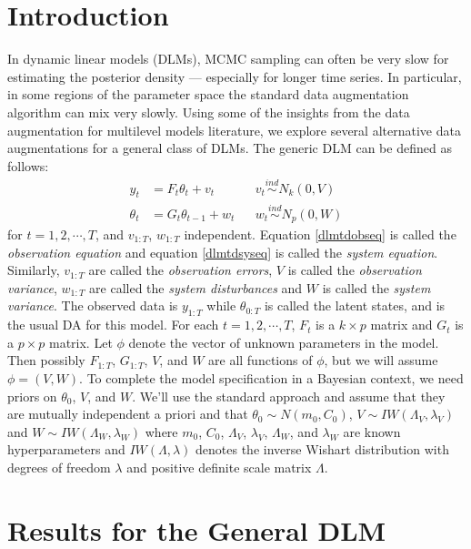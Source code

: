 \documentclass{article}\usepackage[]{graphicx}\usepackage[]{color}
\begin{document}
\section{Introduction}
In dynamic linear models (DLMs), MCMC sampling can often be very slow for estimating the posterior density --- especially for longer time series. In particular, in some regions of the parameter space the standard data augmentation algorithm can mix very slowly. Using some of the insights from the data augmentation for multilevel models literature, we explore several alternative data augmentations for a general class of DLMs. The generic DLM can be defined as follows:
\begin{align}
  y_t &= F_t\theta_t + v_t && v_t \stackrel{ind}{\sim} N_k(0,V) \label{dlmtdobseq}\\
  \theta_t &= G_t\theta_{t-1} + w_t && w_t \stackrel{ind}{\sim} N_p(0,W) \label{dlmtdsyseq}
\end{align}
for $t=1,2,\cdots,T$, and $v_{1:T}$, $w_{1:T}$ independent. Equation \eqref{dlmtdobseq} is called the {\it observation equation} and equation \eqref{dlmtdsyseq} is called the {\it system equation}. Similarly, $v_{1:T}$ are called the {\it observation errors}, $V$ is called the {\it observation variance}, $w_{1:T}$ are called the {\it system disturbances} and $W$ is called the {\it system variance}. The observed data is $y_{1:T}$ while $\theta_{0:T}$ is called the latent states, and is the usual DA for this model. For each $t=1,2,\cdots,T$, $F_t$ is a $k\times p$ matrix and $G_t$ is a $p\times p$ matrix. Let $\phi$ denote the vector of unknown parameters in the model. Then possibly $F_{1:T}$, $G_{1:T}$, $V$, and $W$ are all functions of $\phi$, but we will assume $\phi=(V,W)$. To complete the model specification in a Bayesian context, we need priors on $\theta_0$, $V$, and $W$. We'll use the standard approach and assume that they are mutually independent a priori and that $\theta_0 \sim N(m_0, C_0)$, $V \sim IW(\Lambda_V, \lambda_V)$ and $W \sim IW(\Lambda_W, \lambda_W)$ where $m_0$, $C_0$, $\Lambda_V$, $\lambda_V$, $\Lambda_W$, and $\lambda_W$ are known hyperparameters and $IW(\Lambda, \lambda)$ denotes the inverse Wishart distribution with degrees of freedom $\lambda$ and positive definite scale matrix $\Lambda$.

\section{Results for the General DLM}
\end{document}
